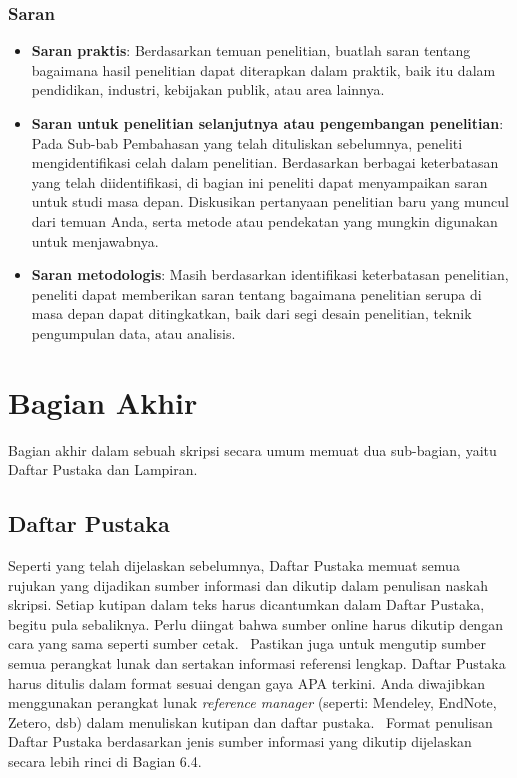 \documentclass[
  indonesian,
  letterpaper,
]{scrbook}
\providecommand{\tightlist}{%
  \setlength{\itemsep}{0pt}\setlength{\parskip}{0pt}}
\begin{document}
\subsubsection{Saran}\label{saran}

\begin{itemize}
\tightlist
\item
  \textbf{Saran praktis}: Berdasarkan temuan penelitian, buatlah saran
  tentang bagaimana hasil penelitian dapat diterapkan dalam praktik,
  baik itu dalam pendidikan, industri, kebijakan publik, atau area
  lainnya.
\item
  \textbf{Saran untuk penelitian selanjutnya atau pengembangan
  penelitian}: Pada Sub-bab Pembahasan yang telah dituliskan sebelumnya,
  peneliti mengidentifikasi celah dalam penelitian. Berdasarkan berbagai
  keterbatasan yang telah diidentifikasi, di bagian ini peneliti dapat
  menyampaikan saran untuk studi masa depan. Diskusikan pertanyaan
  penelitian baru yang muncul dari temuan Anda, serta metode atau
  pendekatan yang mungkin digunakan untuk menjawabnya.
\item
  \textbf{Saran metodologis}: Masih berdasarkan identifikasi
  keterbatasan penelitian, peneliti dapat memberikan saran tentang
  bagaimana penelitian serupa di masa depan dapat ditingkatkan, baik
  dari segi desain penelitian, teknik pengumpulan data, atau analisis.
\end{itemize}

\section{Bagian Akhir}\label{bagian-akhir}

Bagian akhir dalam sebuah skripsi secara umum memuat dua sub-bagian,
yaitu Daftar Pustaka dan Lampiran.

\subsection{Daftar Pustaka}\label{daftar-pustaka-1}

Seperti yang telah dijelaskan sebelumnya, Daftar Pustaka memuat semua
rujukan yang dijadikan sumber informasi dan dikutip dalam penulisan
naskah skripsi. Setiap kutipan dalam teks harus dicantumkan dalam Daftar
Pustaka, begitu pula sebaliknya. Perlu diingat bahwa sumber online harus
dikutip dengan cara yang sama seperti sumber cetak.~ Pastikan juga untuk
mengutip sumber semua perangkat lunak dan sertakan informasi referensi
lengkap. Daftar Pustaka harus ditulis dalam format sesuai dengan gaya
APA terkini. Anda diwajibkan menggunakan perangkat lunak \emph{reference
manager} (seperti: Mendeley, EndNote, Zetero, dsb) dalam menuliskan
kutipan dan daftar pustaka.~ Format penulisan Daftar Pustaka berdasarkan
jenis sumber informasi yang dikutip dijelaskan secara lebih rinci di
Bagian 6.4.
\end{document}
